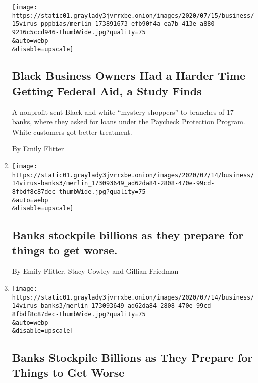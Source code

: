 \begin{enumerate}
  \texttt{[image: https://static01.graylady3jvrrxbe.onion/images/2020/07/15/business/15virus-pppbias/merlin\_173891673\_efb90f4a-ea7b-413e-a880-9216c5ccd946-thumbWide.jpg?quality=75\\\&auto=webp\\\&disable=upscale]}

  \hypertarget{black-business-owners-had-a-harder-time-getting-federal-aid-a-study-finds-1}{%
  \subsection{Black Business Owners Had a Harder Time Getting Federal
  Aid, a Study
  Finds}\label{black-business-owners-had-a-harder-time-getting-federal-aid-a-study-finds-1}}

  A nonprofit sent Black and white ``mystery shoppers'' to branches of
  17 banks, where they asked for loans under the Paycheck Protection
  Program. White customers got better treatment.

  By Emily Flitter
\item
  \href{/live/2020/07/14/business/stock-market-updates-coronavirus/banks-stockpile-billions-as-they-prepare-for-things-to-get-worse}{}

  \texttt{[image: https://static01.graylady3jvrrxbe.onion/images/2020/07/14/business/14virus-banks3/merlin\_173093649\_ad62da84-2808-470e-99cd-8fbdf8c87dec-thumbWide.jpg?quality=75\\\&auto=webp\\\&disable=upscale]}

  \hypertarget{banks-stockpile-billions-as-they-prepare-for-things-to-get-worse}{%
  \subsection{Banks stockpile billions as they prepare for things to get
  worse.}\label{banks-stockpile-billions-as-they-prepare-for-things-to-get-worse}}

  By Emily Flitter, Stacy Cowley and Gillian Friedman
\item
  \href{/2020/07/14/business/big-banks-quarterly-results.html}{}

  \texttt{[image: https://static01.graylady3jvrrxbe.onion/images/2020/07/14/business/14virus-banks3/merlin\_173093649\_ad62da84-2808-470e-99cd-8fbdf8c87dec-thumbWide.jpg?quality=75\\\&auto=webp\\\&disable=upscale]}

  \hypertarget{banks-stockpile-billions-as-they-prepare-for-things-to-get-worse-1}{%
  \subsection{Banks Stockpile Billions as They Prepare for Things to Get
  Worse}\label{banks-stockpile-billions-as-they-prepare-for-things-to-get-worse-1}}


\end{enumerate}
